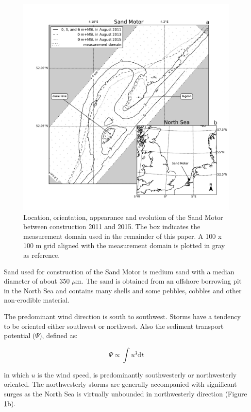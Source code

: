 \begin{figure}
  \centering
  \includegraphics[width=\columnwidth]{../Figures/location_and_evolution}
  \caption{Location, orientation, appearance and evolution of the Sand
    Motor between construction 2011 and 2015. The box indicates the
    measurement domain used in the remainder of this paper. A 100 x
    100 m grid aligned with the measurement domain is plotted in gray
    as reference.}
  \label{fig:fieldsite2}
\end{figure}

Sand used for construction of the Sand Motor is medium sand with a
median diameter of about 350 $\mu \mathrm{m}$. The sand is obtained
from an offshore borrowing pit in the North Sea and contains many
shells and some pebbles, cobbles and other non-erodible material.

The predominant wind direction is south to southwest. Storms have a
tendency to be oriented either southwest or northwest. Also the
sediment transport potential ($\Psi$), defined as:

\begin{equation}
  \label{eq:transport_potential}
  \Psi \propto \int u^3 \mathrm{d}t
\end{equation}

\noindent in which $u$ is the wind speed, is predominantly
southwesterly or northwesterly oriented. The northwesterly storms are
generally accompanied with significant surges as the North Sea is
virtually unbounded in northwesterly direction (Figure
\ref{fig:fieldsite2}b).

